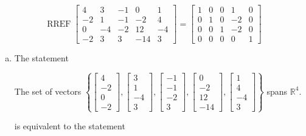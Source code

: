 \begin{exerciseAnswer} 


\[\operatorname{RREF} \left[\begin{array}{ccccc}
4 & 3 & -1 & 0 & 1 \\
-2 & 1 & -1 & -2 & 4 \\
0 & -4 & -2 & 12 & -4 \\
-2 & 3 & 3 & -14 & 3
\end{array}\right] = \left[\begin{array}{ccccc}
1 & 0 & 0 & 1 & 0 \\
0 & 1 & 0 & -2 & 0 \\
0 & 0 & 1 & -2 & 0 \\
0 & 0 & 0 & 0 & 1
\end{array}\right] \]


\begin{enumerate}[(a)]
\item The statement 
\begin{center}\begin{minipage}{0.8\textwidth}
 The set of vectors \( \left\{ \left[\begin{array}{c}
4 \\
-2 \\
0 \\
-2
\end{array}\right] , \left[\begin{array}{c}
3 \\
1 \\
-4 \\
3
\end{array}\right] , \left[\begin{array}{c}
-1 \\
-1 \\
-2 \\
3
\end{array}\right] , \left[\begin{array}{c}
0 \\
-2 \\
12 \\
-14
\end{array}\right] , \left[\begin{array}{c}
1 \\
4 \\
-4 \\
3
\end{array}\right] \right\} \) spans \(\mathbb{R}^4\). 
\end{minipage}\end{center}
     is equivalent to the statement 

\end{enumerate}
\end{exerciseAnswer}
